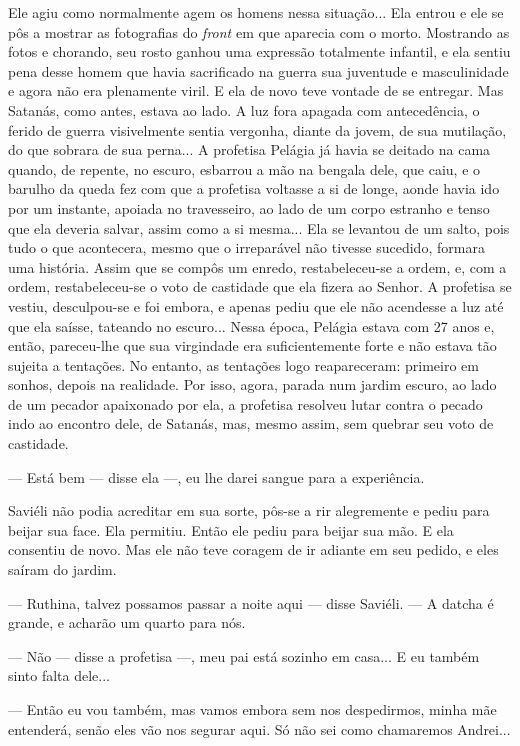 Ele agiu como normalmente agem os homens nessa situação... Ela entrou e
ele se pôs a mostrar as fotografias do \emph{front} em que aparecia com
o morto. Mostrando as fotos e chorando, seu rosto ganhou uma expressão
totalmente infantil, e ela sentiu pena desse homem que havia sacrificado
na guerra sua juventude e masculinidade e agora não era plenamente
viril. E ela de novo teve vontade de se entregar. Mas Satanás, como
antes, estava ao lado. A luz fora apagada com antecedência, o ferido de
guerra visivelmente sentia vergonha, diante da jovem, de sua mutilação,
do que sobrara de sua perna... A profetisa Pelágia já havia se deitado
na cama quando, de repente, no escuro, esbarrou a mão na bengala dele,
que caiu, e o barulho da queda fez com que a profetisa voltasse a si de
longe, aonde havia ido por um instante, apoiada no travesseiro, ao lado
de um corpo estranho e tenso que ela deveria salvar, assim como a si
mesma... Ela se levantou de um salto, pois tudo o que acontecera, mesmo
que o irreparável não tivesse sucedido, formara uma história. Assim que
se compôs um enredo, restabeleceu-se a ordem, e, com a ordem,
restabeleceu-se o voto de castidade que ela fizera ao Senhor. A
profetisa se vestiu, desculpou-se e foi embora, e apenas pediu que ele
não acendesse a luz até que ela saísse, tateando no escuro... Nessa
época, Pelágia estava com 27 anos e, então, pareceu-lhe que sua
virgindade era suficientemente forte e não estava tão sujeita a
tentações. No entanto, as tentações logo reapareceram: primeiro em
sonhos, depois na realidade. Por isso, agora, parada num jardim escuro,
ao lado de um pecador apaixonado por ela, a profetisa resolveu lutar
contra o pecado indo ao encontro dele, de Satanás, mas, mesmo assim, sem
quebrar seu voto de castidade.

--- Está bem --- disse ela ---, eu lhe darei sangue para a experiência.

Saviéli não podia acreditar em sua sorte, pôs-se a rir alegremente e
pediu para beijar sua face. Ela permitiu. Então ele pediu para beijar
sua mão. E ela consentiu de novo. Mas ele não teve coragem de ir adiante
em seu pedido, e eles saíram do jardim.

--- Ruthina, talvez possamos passar a noite aqui --- disse Saviéli. ---
A datcha é grande, e acharão um quarto para nós.

--- Não --- disse a profetisa ---, meu pai está sozinho em casa... E eu
também sinto falta dele...

--- Então eu vou também, mas vamos embora sem nos despedirmos, minha mãe
entenderá, senão eles vão nos segurar aqui. Só não sei como chamaremos
Andrei...

